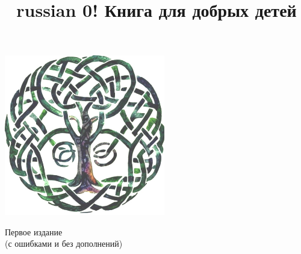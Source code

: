 \documentclass[a5paper,11pt]{memoir}
\title{\begin{otherlanguage*}{russian}
0! Книга для добрых детей
\end{otherlanguage*}}
\author{}
\begin{document}

\date{} %
\maketitle
\begin{center}
\includegraphics[height=7cm]{images/tree-cover} 

\vspace{4cm}
\tiny{
Первое издание\\
(с ошибками и без дополнений)
}
\end{center}


\thispagestyle{empty}
\newpage
\thispagestyle{empty}  %


\clearpage
\hfill
\end{document}
